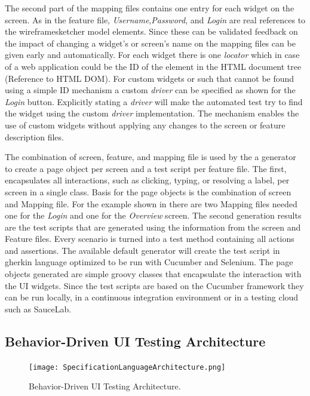 \documentclass{sig-alternate-05-2015}
\begin{document}
The second part of the mapping files contains one entry for each widget on the screen.
As in the feature file, \textit{Username},\textit{Password}, and \textit{Login} are real references to the wireframesketcher model elements.
Since these can be validated feedback on the impact of changing a widget's or screen's name on the mapping files can be given early and automatically.
For each widget there is one \textit{locator} which in case of a web application could be the ID of the element in the HTML document tree (Reference to HTML DOM).
For custom widgets or such that cannot be found using a simple ID mechanism a custom \textit{driver} can be specified as shown for the \textit{Login} button.
Explicitly stating a \textit{driver} will make the automated test try to find the widget using the custom \textit{driver} implementation. 
The mechanism enables the use of custom widgets without applying any changes to the screen or feature description files.

The combination of screen, feature, and mapping file is used by the a generator to create a page object per screen and a test script per feature file.
The first, encapsulates all interactions, such as clicking, typing, or resolving a label, per screen in a single class.
Basis for the page objects is the combination of screen and Mapping file.
For the example shown in  there are two Mapping files needed one for the \textit{Login} and one for the \textit{Overview} screen.
The second generation results are the test scripts that are generated using the information from the screen and Feature files.
Every scenario is turned into a test method containing all actions and assertions.
The available default generator will create the test script in gherkin language optimized to be run with Cucumber and Selenium.
The page objects generated are simple groovy classes that encapsulate the interaction with the UI widgets.
Since the test scripts are based on the Cucumber framework they can be run locally, in a continuous integration environment or in a testing cloud such as SauceLab.

\subsection{Behavior-Driven UI Testing Architecture}
\begin{figure}[h]
	\centering
	\texttt{[image: SpecificationLanguageArchitecture.png]}
	\caption{Behavior-Driven UI Testing Architecture.}
	\label{fig:architectureOverview}
\end{figure}
\end{document}
